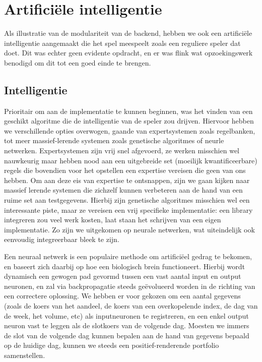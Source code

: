 %
%

\chapter{Artifici\"ele intelligentie}

Als illustratie van de modulariteit van de backend, hebben we ook een artifici\"ele intelligentie aangemaakt die het spel meespeelt zoals een reguliere speler dat doet. Dit was echter geen evidente opdracht, en er was flink wat opzoekingswerk benodigd om dit tot een goed einde te brengen.

\section{Intelligentie}

Prioritair om aan de implementatie te kunnen beginnen, was het vinden van een geschikt algoritme die de intelligentie van de speler zou drijven. Hiervoor hebben we verschillende opties overwogen, gaande van expertsystemen zoals regelbanken, tot meer massief-lerende systemen zoals genetische algoritmes of neurle netwerken. Expertsystemen zijn vrij snel afgevoerd, ze werken misschien wel nauwkeurig maar hebben nood aan een uitgebreide set (moeilijk kwantificeerbare) regels die bovendien voor het opstellen een expertise vereisen die geen van ons hebben. Om aan deze eis van expertise te ontsnappen, zijn we gaan kijken naar massief lerende systemen die zichzelf kunnen verbeteren aan de hand van een ruime set aan testgegevens. Hierbij zijn genetische algoritmes misschien wel een interessante piste, maar ze vereisen een vrij specifieke implementatie: een library integreren zou veel werk kosten, laat staan het schrijven van een eigen implementatie. Zo zijn we uitgekomen op neurale netwerken, wat uiteindelijk ook eenvoudig integreerbaar bleek te zijn.

Een neuraal netwerk is een populaire methode om artifici\"eel gedrag te bekomen, en baseert zich daarbij op hoe een biologisch brein functioneert. Hierbij wordt dynamisch een gewogen pad gevormd tussen een vast aantal input en output neuronen, en zal via backpropagatie steeds ge\"evolueerd worden in de richting van een correctere oplossing. We hebben er voor gekozen om een aantal gegevens (zoals de koers van het aandeel, de koers van een overkopelende index, de dag van de week, het volume, etc) als inputneuronen te registreren, en een enkel output neuron vast te leggen als de slotkoers van de volgende dag. Moesten we immers de slot van de volgende dag kunnen bepalen aan de hand van gegevens bepaald op de huidige dag, kunnen we steeds een positief-renderende portfolio samenstellen.

